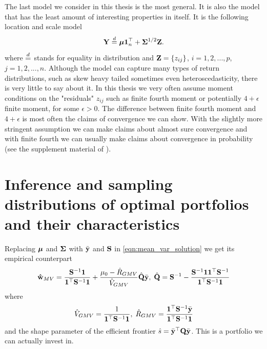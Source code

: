 \documentclass[oneside]{book}\usepackage{knitr}
\begin{document}
% 
The last model we consider in this thesis is the most general.
It is also the model that has the least amount of interesting properties in itself.
It is the following location and scale model
\begin{equation}\label{eqn:location_scale_model}
\mathbf{Y} \stackrel{d}{=} \mbox{\boldmath$\mu$} \mathbf{1}^\top_n + \mathbf{\Sigma}^{1/2} \mathbf{Z}.
\end{equation}
where $\stackrel{d}{=}$ stands for equality in distribution and $\mathbf{Z} = \{z_{ij}\}$, $i=1,2,...,p$, $j=1,2,...,n$.
Although the model can capture many types of return distributions, such as skew heavy tailed sometimes even heteroscedasticity, there is very little to say about it.
In this thesis we very often assume moment conditions on the "residuals" $z_{ij}$ such as finite fourth moment or potentially $4+\epsilon$ finite moment, for some $\epsilon>0$.
The difference between finite fourth moment and $4+\epsilon$ is most often the claims of convergence we can show.
With the slightly more stringent assumption we can make claims about almost sure convergence and with finite fourth we can usually make claims about convergence in probability (see the supplement material of \citet{BodnarGuptaParolya2016}).

\section{Inference and sampling distributions of optimal portfolios and their characteristics}
Replacing $\mbox{\boldmath$\mu$}$ and $\mathbf{\Sigma}$ with $\bar{\mathbf{y}}$ and $\mathbf{S}$ in \eqref{eqn:mean_var_solution} we get its empirical counterpart
\begin{equation}\label{eqn:meanvar_solution_sample}
	\mathbf{\hat{w}}_{MV} = \frac{\mathbf{S}^{-1}\mathbf{1}}{\mathbf{1}^\top \mathbf{S}^{-1}\mathbf{1}} + \frac{\mu_0 - \hat{R}_{GMV}}{\hat{V}_{GMV}} \hat{\mathbf{Q}} \bar{\mathbf{y}},\; \hat{\mathbf{Q}} = \mathbf{S}^{-1} - \frac{\mathbf{S}^{-1} \mathbf{1} \mathbf{1}^\top \mathbf{S}^{-1}}{\mathbf{1}^\top \mathbf{S}^{-1} \mathbf{1}}
\end{equation}
where 
\begin{equation}\label{eqn:meanvar_characteristics_sample}
  \hat{V}_{GMV} = \frac{1}{\mathbf{1}^\top \mathbf{S}^{-1}\mathbf{1}},\; \hat{R}_{GMV} = \frac{\mathbf{1}^\top \mathbf{S}^{-1} \bar{\mathbf{y}}}{\mathbf{1}^\top \mathbf{S}^{-1}\mathbf{1}}
\end{equation}
and the shape parameter of the efficient frontier $\hat{s} = \bar{\mathbf{y}}^\top \mathbf{Q} \bar{\mathbf{y}}$.
This is a portfolio we can actually invest in. 
\end{document}
